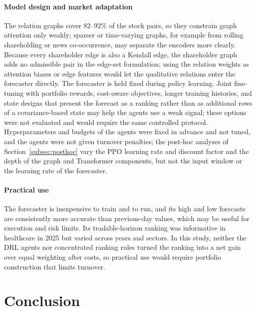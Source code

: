 \documentclass[pdflatex,sn-mathphys-num]{sn-jnl}%
\theoremstyle{thmstyleone}%
\theoremstyle{thmstyletwo}%
\theoremstyle{thmstylethree}%
\begin{document}
{\paragraph{Model design and market adaptation}
The relation graphs cover 82--92\% of the stock pairs, so they constrain graph attention only weakly; sparser or time-varying graphs, for example from rolling shareholding or news co-occurrence, may separate the encoders more clearly. Because every shareholder edge is also a Kendall edge, the shareholder graph adds no admissible pair in the edge-set formulation; using the relation weights as attention biases or edge features would let the qualitative relations enter the forecaster directly. The forecaster is held fixed during policy learning. Joint fine-tuning with portfolio rewards, cost-aware objectives, longer training histories, and state designs that present the forecast as a ranking rather than as additional rows of a covariance-based state may help the agents use a weak signal; these options were not evaluated and would require the same controlled protocol. Hyperparameters and budgets of the agents were fixed in advance and not tuned, and the agents were not given turnover penalties; the post-hoc analyses of Section~\ref{subsec:posthoc} vary the PPO learning rate and discount factor and the depth of the graph and Transformer components, but not the input window or the learning rate of the forecaster.

\paragraph{Practical use}
The forecaster is inexpensive to train and to run, and its high and low forecasts are consistently more accurate than previous-day values, which may be useful for execution and risk limits. Its tradable-horizon ranking was informative in healthcare in 2025 but varied across years and sectors. In this study, neither the DRL agents nor concentrated ranking rules turned the ranking into a net gain over equal weighting after costs, so practical use would require portfolio construction that limits turnover.\par}

\section{Conclusion}\label{sec6}
\end{document}
